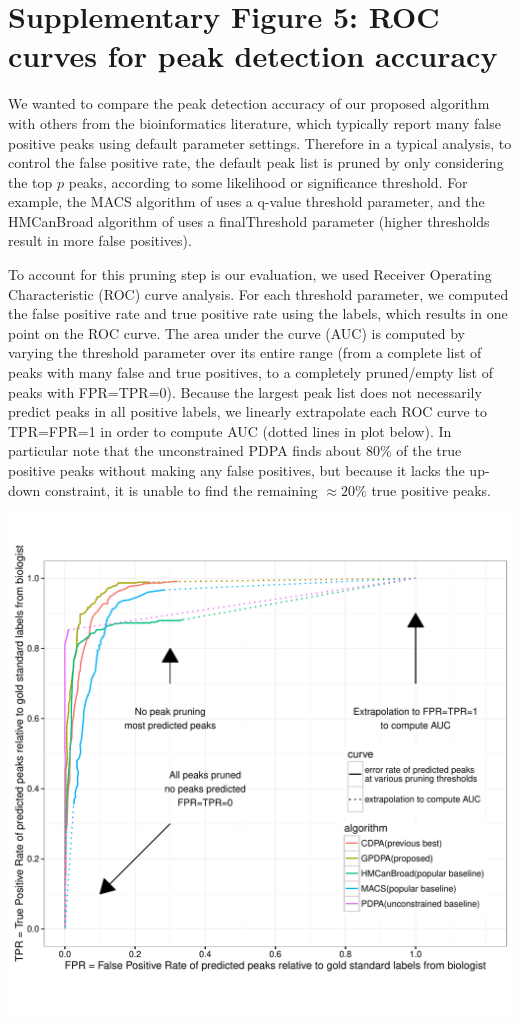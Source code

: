 \documentclass{article}
\begin{document}
\section*{Supplementary Figure 5: ROC curves for peak detection accuracy}
  
We wanted to compare the peak detection accuracy of our proposed
algorithm with others from the bioinformatics literature, which
typically report many false positive peaks using default parameter
settings. Therefore in a typical analysis, to control
the false positive rate, the default peak list is pruned by only
considering the top $p$ peaks, according to some likelihood or
significance threshold. For example, the MACS algorithm of
\citet{MACS} uses a q-value threshold parameter, and the HMCanBroad
algorithm of \citet{HMCan} uses a finalThreshold parameter (higher
thresholds result in more false positives). 

To account for this pruning step is our evaluation, we used Receiver
Operating Characteristic (ROC) curve analysis. For each threshold
parameter, we computed the false positive rate and true positive rate
using the labels, which results in one point on the ROC curve. The
area under the curve (AUC) is computed by varying the threshold
parameter over its entire range (from a complete list of peaks with
many false and true positives, to a completely pruned/empty list of
peaks with FPR=TPR=0).
Because the largest peak list does not necessarily predict peaks in
all positive labels, we linearly extrapolate each ROC curve to
TPR=FPR=1 in order to compute AUC (dotted lines in plot below). 
In particular note that the unconstrained PDPA finds about 80\% of the true positive peaks
without making any false positives, but because it lacks the up-down constraint, 
it is unable to find the remaining $\approx 20\%$ true positive peaks.

\includegraphics[width=\textwidth]{figure-test-error-dots-ROC-supp.pdf}
\end{document}
